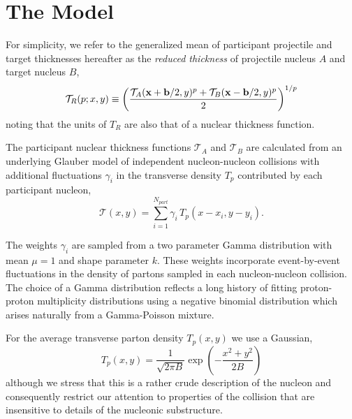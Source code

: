 \documentclass[aps,prl,reprint,amsmath,nofootinbib]{revtex4-1}
\begin{document}
\section{The Model}

For simplicity, we refer to the generalized mean of participant projectile and target thicknesses hereafter as the \emph{reduced thickness} of projectile 
nucleus $A$ and target nucleus $B$,
\begin{equation}
 \label{reduced}
 \mathcal{T}_R(p;x,y) \equiv \left( \frac{\mathcal{T}_A({\bf x}+{\bf b}/2,y)^p + \mathcal{T}_B({\bf x}-{\bf b}/2,y)^p}{2} \right)^{1/p}
\end{equation}
noting that the units of $T_R$ are also that of a nuclear thickness function. 

The participant nuclear thickness functions $\mathcal{T}_A$ and $\mathcal{T}_B$ are calculated from an underlying Glauber model of independent nucleon-nucleon 
collisions with additional fluctuations $\gamma_i$ in the transverse density $T_p$ contributed by each participant nucleon,
\begin{equation}
 \label{thickness def}
 \mathcal{T}(x,y) = \sum\limits_{i=1}^{N_{part}} \gamma_i\, T_p(x-x_i,y-y_i).
\end{equation}

The weights $\gamma_i$ are sampled from a two parameter Gamma distribution with mean $\mu=1$ and shape parameter $k$. These weights incorporate event-by-event 
fluctuations in the density of partons sampled in each nucleon-nucleon collision. The choice of a Gamma distribution reflects a long history of fitting proton-proton 
multiplicity distributions using a negative binomial distribution which arises naturally from a Gamma-Poisson mixture.

For the average transverse parton density $T_p(x,y)$ we use a Gaussian,
\begin{equation}
 T_p(x,y) = \frac{1}{\sqrt{2 \pi B}} \exp\left(-\frac{x^2+y^2}{2 B}\right) 
\end{equation}
although we stress that this is a rather crude description of the nucleon and consequently restrict our attention to properties of the collision that are 
insensitive to details of the nucleonic substructure.
\end{document}
